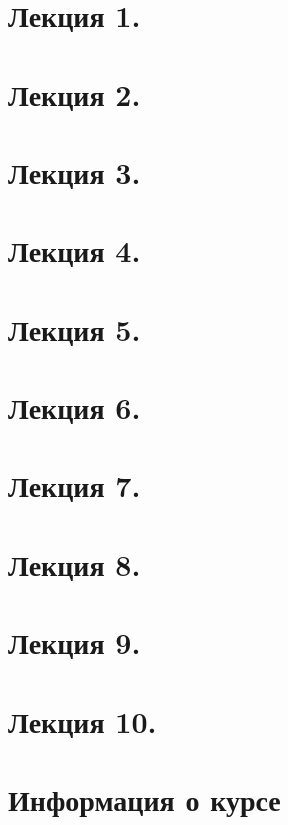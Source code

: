\newpage
\section{Лекция 1.}


\newpage
\section{Лекция 2.}


\newpage
\section{Лекция 3.}


\newpage
\section{Лекция 4.}


\newpage
\section{Лекция 5.}


\newpage
\section{Лекция 6.}


\newpage
\section{Лекция 7.}


\newpage
\section{Лекция 8.}


\newpage
\section{Лекция 9.}

\newpage
\section{Лекция 10.}



\newpage
\section{Информация о курсе}
